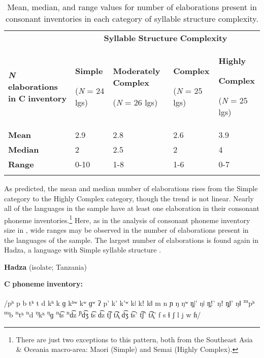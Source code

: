 \begin{table}
\begin{tabularx}{\textwidth}{XXXXX}
 & \multicolumn{4}{c}{ \textbf{Syllable} \textbf{Structure} \textbf{Complexity}}\\
\lsptoprule
\textbf{\textit{N}} \textbf{elaborations} \textbf{in} \textbf{C} \textbf{inventory} & { \textbf{Simple}}

 (\textit{N} = 24 lgs) & { \textbf{Moderately} \textbf{Complex}}

 (\textit{N} = 26 lgs) & { \textbf{Complex}}

 (\textit{N} = 25 lgs) & { \textbf{Highly} }

{ \textbf{Complex}}

 (\textit{N} = 25 lgs)\\
\textbf{Mean} & 2.9 & 2.8 & 2.6 & 3.9\\
\textbf{Median} & 2 & 2.5 & 2 & 4\\
\textbf{Range} & 0-10 & 1-8 & 1-6 & 0-7\\
\lspbottomrule
\end{tabularx}
\caption{\label{4.11}Mean, median, and range values for number of elaborations present in consonant inventories in each category of syllable structure complexity.}
\end{table}

  As predicted, the mean and median number of elaborations rises from the Simple category to the Highly Complex category, though the trend is not linear. Nearly all of the languages in the sample have at least one elaboration in their consonant phoneme inventories.\footnote{ \textrm{There are just two exceptions to this pattern, both from the Southeast Asia \& Oceania macro-area: Maori (Simple) and Semai (Highly Complex).} } Here, as in the analysis of consonant phoneme inventory size in , wide ranges may be observed in the number of elaborations present in the languages of the sample. The largest number of elaborations is found again in Hadza, a language with Simple syllable structure .

\ea\label{ex:(4.27)}
  \textbf{Hadza} (isolate; Tanzania)

\textbf{C} \textbf{phoneme} \textbf{inventory:} 

/pʰ p b tʰ t d kʰ k ɡ kʰʷ kʷ ɡʷ ʔ p’ k’ k’ʷ kǀ kǃ kǁ m n ɲ ŋ ŋʷ ŋ̥ǀ’ ŋǀ ŋ̥ǃ’ ŋǃ ŋ̥ǁ’ ŋǁ \textsuperscript{m}pʰ \textsuperscript{m}b \textsuperscript{n}tʰ \textsuperscript{n}d \textsuperscript{ŋ}kʰ \textsuperscript{ŋ}ɡ \textsuperscript{n}t͡s \textsuperscript{n}d͡z \textsuperscript{ɲ}d͡ʒ t͡s d͡z t͡ʃ t͡ʎ̥ d͡ʒ t͡s’ t͡ʃ’ t͡ʎ̥’ f s ɬ ʃ l j w ɦ/


